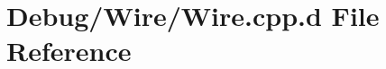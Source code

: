 \hypertarget{_debug_2_wire_2_wire_8cpp_8d}{\section{\-Debug/\-Wire/\-Wire.cpp.\-d \-File \-Reference}
\label{_debug_2_wire_2_wire_8cpp_8d}
}
